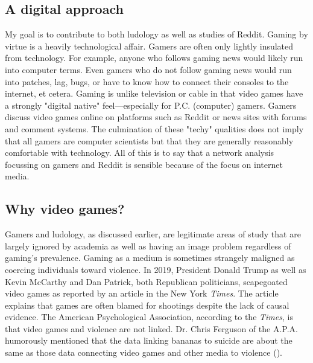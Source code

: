 \documentclass[12pt, a4paper]{article}
\begin{document}
\subsection{A digital approach}
My goal is to contribute to both ludology as well as studies of Reddit. Gaming by virtue is a heavily technological affair. Gamers are often only lightly insulated from technology. For example, anyone who follows gaming news would likely run into computer terms. Even gamers who do not follow gaming news would run into patches, lag, bugs, or have to know how to connect their consoles to the internet, et cetera. Gaming is unlike television or cable in that video games have a strongly "digital native" feel---especially for P.C. (computer) gamers. Gamers discuss video games online on platforms such as Reddit or news sites with forums and comment systems. The culmination of these "techy" qualities does not imply that all gamers are computer scientists but that they are generally reasonably comfortable with technology. All of this is to say that a network analysis focussing on gamers and Reddit is sensible because of the focus on internet media.

\subsection{Why video games?}
Gamers and ludology, as discussed earlier, are legitimate areas of study that are largely ignored by academia as well as having an image problem regardless of gaming's prevalence. Gaming as a medium is sometimes strangely maligned as coercing individuals toward violence. In 2019, President Donald Trump as well as Kevin McCarthy and Dan Patrick, both Republican politicians, scapegoated video games as reported by an article in the New York \textit{Times}. The article explains that games are often blamed for shootings despite the lack of causal evidence. The American Psychological Association, according to the \textit{Times}, is that video games and violence are not linked. Dr. Chris Ferguson of the A.P.A. humorously mentioned that the data linking bananas to suicide are about the same as those data connecting video games and other media to violence (\cite{drapernyt0819}).
\end{document}
